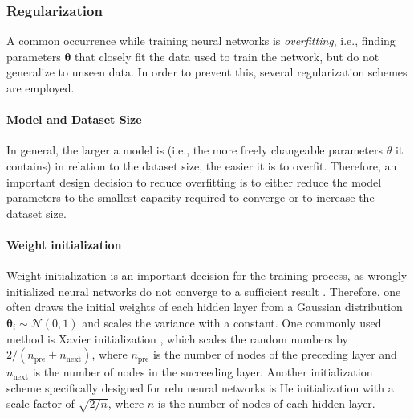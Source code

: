\subsubsection{Regularization}
\label{subsec:bg.nn.reg}

A common occurrence while training neural networks is \emph{overfitting}, i.e., finding parameters $\boldsymbol{\theta}$ that closely fit the data used to train the network, but do not generalize to unseen data. In order to prevent this, several regularization schemes are employed.

\paragraph{Model and Dataset Size}
In general, the larger a model is (i.e., the more freely changeable parameters $\theta$ it contains) in relation to the dataset size, the easier it is to overfit. Therefore, an important design decision to reduce overfitting is to either reduce the model parameters to the smallest capacity required to converge or to increase the dataset size.

\paragraph{Weight initialization}
Weight initialization is an important decision for the training process, as wrongly initialized neural networks do not converge to a sufficient result \citep{pmlr-v9-glorot10a,Sutskever:2013:IIM:3042817.3043064}. Therefore, one often draws the initial weights of each hidden layer from a Gaussian distribution $\boldsymbol{\theta}_i \sim \mathcal{N}(0,1)$ and scales the variance with a constant. One commonly used method is Xavier initialization \citep{pmlr-v9-glorot10a}, which scales the random numbers by $2/(n_{\text{pre}} + n_{\text{next}})$, where $n_{\text{pre}}$ is the number of nodes of the preceding layer and $n_{\text{next}}$ is the number of nodes in the succeeding layer. Another initialization scheme specifically designed for \gls{relu} neural networks is He initialization \citep{He:2015:DDR:2919332.2919814} with a scale factor of $\sqrt{2/n}$, where $n$ is the number of nodes of each hidden layer.

